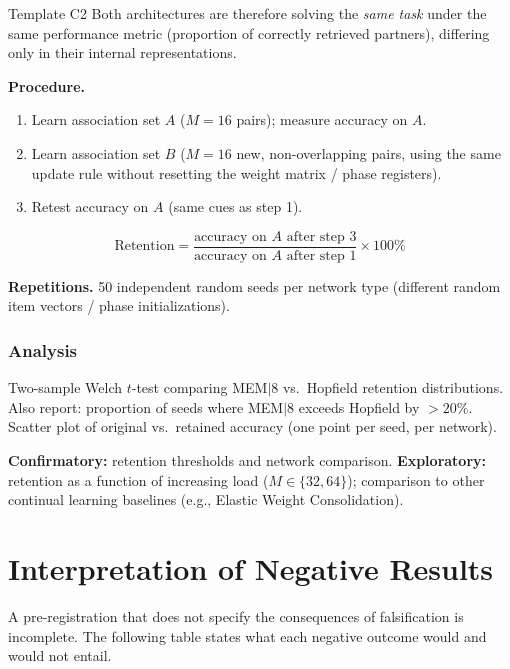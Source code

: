 \documentclass[11pt, a4paper]{article}
\newcommand{\mem}{MEM$|$8}
\begin{document}
\begin{predbox}{Template C2}
Both architectures are therefore solving the \emph{same task} under the same
performance metric (proportion of correctly retrieved partners), differing only
in their internal representations.

\textbf{Procedure.}
\begin{enumerate}
  \item Learn association set $A$ ($M = 16$ pairs); measure accuracy on $A$.
  \item Learn association set $B$ ($M = 16$ new, non-overlapping pairs, using
    the same update rule without resetting the weight matrix / phase registers).
  \item Retest accuracy on $A$ (same cues as step 1).
\end{enumerate}

\[
  \text{Retention} = \frac{\text{accuracy on } A \text{ after step 3}}
                          {\text{accuracy on } A \text{ after step 1}} \times 100\%
\]

\textbf{Repetitions.}  50 independent random seeds per network type (different
random item vectors / phase initializations).

\subsubsection{Analysis}

Two-sample Welch $t$-test comparing \mem{} vs.\ Hopfield retention distributions.
Also report: proportion of seeds where \mem{} exceeds Hopfield by $> 20\%$.
Scatter plot of original vs.\ retained accuracy (one point per seed, per network).

\textbf{Confirmatory:} retention thresholds and network comparison.
\textbf{Exploratory:} retention as a function of increasing load
($M \in \{32, 64\}$); comparison to other continual learning baselines
(e.g., Elastic Weight Consolidation).

\end{predbox}

\section{Interpretation of Negative Results}
\label{sec:negative}

A pre-registration that does not specify the consequences of falsification is
incomplete.  The following table states what each negative outcome would and would
not entail.
\end{document}
